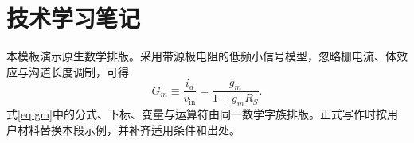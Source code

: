 \documentclass[UTF8,a4paper,zihao=-4,fontset=none]{ctexart}
\begin{document}
\section{技术学习笔记}
本模板演示原生数学排版。采用带源极电阻的低频小信号模型，忽略栅电流、体效应与沟道长度调制，可得
\begin{equation}\label{eq:gm}
G_m\equiv\frac{i_d}{v_{\mathrm{in}}}=\frac{g_m}{1+g_mR_S}.
\end{equation}
式\eqref{eq:gm}中的分式、下标、变量与运算符由同一数学字族排版。正式写作时按用户材料替换本段示例，并补齐适用条件和出处。
\end{document}

